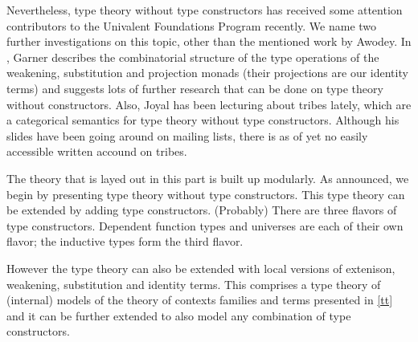 \documentclass{article}
\begin{document}
Nevertheless, type theory without type constructors has received some attention
contributors to the Univalent Foundations Program recently. We name two
further investigations on this topic, other than the mentioned work by Awodey.
In \cite{Garner2014}, Garner describes the combinatorial structure
of the type operations of the weakening, substitution and projection monads
(their projections are our identity terms) and suggests lots of further research
that can be done on type theory without constructors. Also, Joyal has been
lecturing about tribes lately, which are a categorical semantics for type theory
without type constructors. Although his slides have been going around on
mailing lists, there is as of yet no easily accessible written accound on tribes.

The theory that is layed out in this part is built up modularly. As announced,
we begin by presenting type theory without type constructors. This type theory
can be extended by adding type constructors. (Probably) There are three flavors
of type constructors. Dependent function types and universes are each of their
own flavor; the inductive types form the third flavor.

However the type theory can also be extended with local versions of extenison,
weakening, substitution and identity terms. This comprises a type theory of
(internal) models of the theory of contexts families and terms presented in
\autoref{tt} and it can be further extended to also model any combination of
type constructors.









%

%

%



\end{document}
